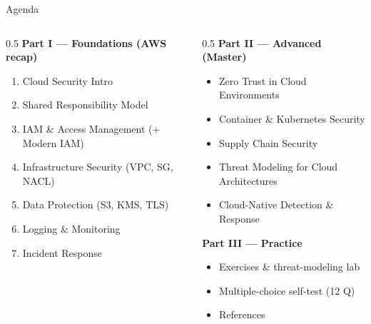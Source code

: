 \documentclass[aspectratio=169,10pt]{beamer}
\begin{document}
\begin{frame}{Agenda}
  \footnotesize
  \begin{columns}[T]
    \begin{column}{0.5\textwidth}
      \textbf{\color{accent}Part I --- Foundations (AWS recap)}
      \begin{enumerate}\setlength\itemsep{1pt}
        \item Cloud Security Intro
        \item Shared Responsibility Model
        \item IAM \& Access Management \textcolor{midgray}{(+ Modern IAM)}
        \item Infrastructure Security (VPC, SG, NACL)
        \item Data Protection (S3, KMS, TLS)
        \item Logging \& Monitoring
        \item Incident Response
      \end{enumerate}
    \end{column}
    \begin{column}{0.5\textwidth}
      \textbf{\color{accent}Part II --- Advanced (Master)}
      \begin{itemize}\setlength\itemsep{1pt}
        \item[A.] Zero Trust in Cloud Environments
        \item[B.] Container \& Kubernetes Security
        \item[C.] Supply Chain Security
        \item[D.] Threat Modeling for Cloud Architectures
        \item[F.] Cloud-Native Detection \& Response
      \end{itemize}
      \vspace{0.6em}
      \textbf{\color{accent}Part III --- Practice}
      \begin{itemize}\setlength\itemsep{1pt}
        \item Exercises \& threat-modeling lab
        \item Multiple-choice self-test (12 Q)
        \item References
      \end{itemize}
    \end{column}
  \end{columns}
\end{frame}
\end{document}

